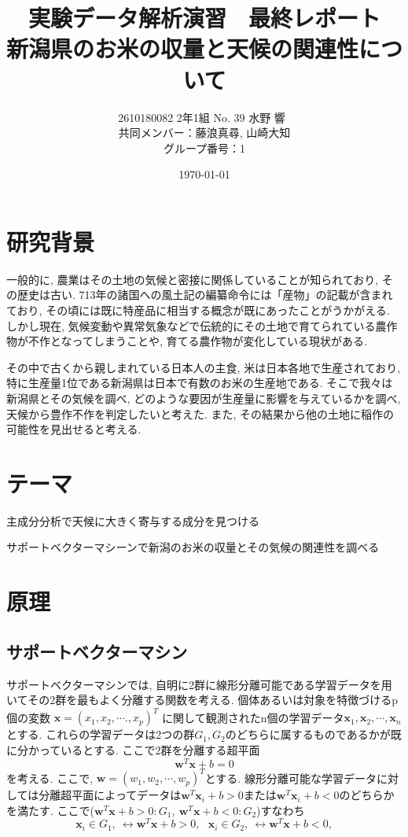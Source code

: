 \documentclass{jarticle}
\title{実験データ解析演習　最終レポート\\ 新潟県のお米の収量と天候の関連性について}
\author{2610180082 2年1組 No. 39  水野 響\ \\ 共同メンバー：藤浪真尋, 山崎大知\\グループ番号：1}
\date{\today}
\begin{document}
\maketitle
\tableofcontents%
\newpage


\section{研究背景}
一般的に, 農業はその土地の気候と密接に関係していることが知られており, その歴史は古い. 713年の諸国への風土記の編纂命令には「産物」の記載が含まれており, その頃には既に特産品に相当する概念が既にあったことがうかがえる. しかし現在, 気候変動や異常気象などで伝統的にその土地で育てられている農作物が不作となってしまうことや, 育てる農作物が変化している現状がある.

その中で古くから親しまれている日本人の主食, 米は日本各地で生産されており, 特に生産量1位である新潟県は日本で有数のお米の生産地である. そこで我々は新潟県とその気候を調べ, どのような要因が生産量に影響を与えているかを調べ, 天候から豊作不作を判定したいと考えた. また, その結果から他の土地に稲作の可能性を見出せると考える.

\hypertarget{header-n2003}{%
\section{テーマ}\label{header-n2003}}

主成分分析で天候に大きく寄与する成分を見つける

サポートベクターマシーンで新潟のお米の収量とその気候の関連性を調べる

\hypertarget{header-n2005}{%
\section{原理}\label{header-n2005}}



\hypertarget{header-n2009}{%
\subsection{サポートベクターマシン}\label{header-n2009}}

サポートベクターマシンでは,
自明に2群に線形分離可能である学習データを用いてその2群を最もよく分離する関数を考える.
個体あるいは対象を特徴づけるp個の変数
\(\bm{x} = (x_1, x_2, \cdots., x_p)^T\) に関して観測されたn個の学習データ$\bm{x}_1,\bm{x}_2,\cdots,\bm{x}_n$とする.
これらの学習データは2つの群$G_1, G_2$のどちらに属するものであるかが既に分かっているとする. 
ここで2群を分離する超平面
\[\bm{w}^T\bm{x} + b = 0\]
を考える. ここで, $\bm{w} = (w_1, w_2, \cdots, w_p)^T$とする.
線形分離可能な学習データに対しては分離超平面によってデータは$\bm{w}^T\bm{x}_i + b  > 0$または$\bm{w}^T\bm{x}_i + b < 0$のどちらかを満たす.
ここで($ \bm{w}^T\bm{x} + b > 0 : G_1,\ \bm{w}^T\bm{x} + b < 0 : G_2$)すなわち
\[\bm{x}_i \in G_1,\ \leftrightarrow  \bm{w}^T\bm{x} + b > 0,\ \ \ \bm{x}_i \in G_2,\ \leftrightarrow  \bm{w}^T\bm{x} + b < 0,\]
\end{document}
